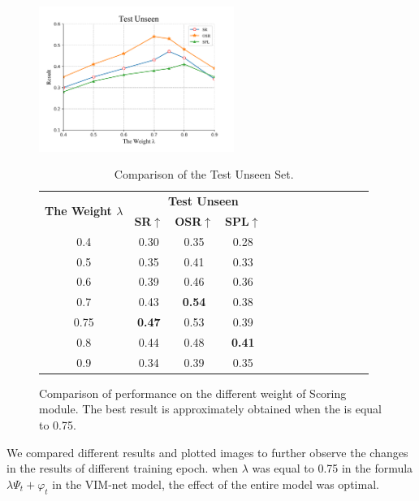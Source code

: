 \begin{figure}[h]
	\begin{minipage}{0.5\textwidth}
		\includegraphics[width=2.5in]{Figure_4.png}
	\end{minipage}
	\hfill
	\begin{minipage}{0.5\textwidth}
		\begin{table}[H]
			\vspace{-2em}
			\centering
			\caption{Comparison of the Test Unseen Set.}
			{\begin{tabular}[c]{ccccccccccccc}
					\toprule[1pt]
					\multirow{2}{*}{{\textbf{The Weight ${\lambda}$}}} & \multicolumn{4}{c}{{\textbf{Test Unseen}}} \\
					
					& \textbf{SR}$\uparrow$ & \textbf{OSR}$\uparrow$ & \textbf{SPL}$\uparrow$	&  \\
					\toprule[1pt]
					
					0.4   & 0.30 & 0.35 & 0.28 \\
					0.5  & 0.35 &  0.41 & 0.33  \\
					0.6    & 0.39 & 0.46 & 0.36  \\
					0.7 	& 0.43 & \textbf{0.54} & 0.38 \\
					0.75   & \textbf{0.47} &  0.53 & 0.39 \\
					0.8   & 0.44 & 0.48 & \textbf{0.41} \\
					0.9   & 0.34 & 0.39 & 0.35 \\
					\bottomrule[1pt]
				\end{tabular}
				\label{table_3}}
		\end{table}
	\end{minipage}
	\caption{Comparison of performance on the different weight of Scoring module. The best result is approximately obtained when the  is equal to 0.75.}
\end{figure}
We compared different results and plotted images to further observe the changes in the results of different training epoch. when ${{\lambda}}$ was equal to 0.75 in the formula ${{\lambda}{\Psi}_{t} + {\varphi}_{t}}$ in the VIM-net model, the effect of the entire model was optimal.

